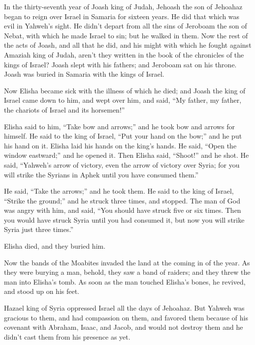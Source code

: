  In the thirty-seventh year of Joash king of Judah, Jehoash
the son of Jehoahaz began to reign over Israel in Samaria for sixteen
years.  He did that which was evil in Yahweh's sight. He
didn't depart from all the sins of Jeroboam the son of Nebat, with which
he made Israel to sin; but he walked in them.  Now the rest
of the acts of Joash, and all that he did, and his might with which he
fought against Amaziah king of Judah, aren't they written in the book of
the chronicles of the kings of Israel?  Joash slept with
his fathers; and Jeroboam sat on his throne. Joash was buried in Samaria
with the kings of Israel.

 Now Elisha became sick with the illness of which he died;
and Joash the king of Israel came down to him, and wept over him, and
said, ``My father, my father, the chariots of Israel and its horsemen!''

 Elisha said to him, ``Take bow and arrows;'' and he took
bow and arrows for himself.  He said to the king of Israel,
``Put your hand on the bow;'' and he put his hand on it. Elisha laid his
hands on the king's hands.  He said, ``Open the window
eastward;'' and he opened it. Then Elisha said, ``Shoot!'' and he shot.
He said, ``Yahweh's arrow of victory, even the arrow of victory over
Syria; for you will strike the Syrians in Aphek until you have consumed
them.''

 He said, ``Take the arrows;'' and he took them. He said to
the king of Israel, ``Strike the ground;'' and he struck three times,
and stopped.  The man of God was angry with him, and said,
``You should have struck five or six times. Then you would have struck
Syria until you had consumed it, but now you will strike Syria just
three times.''

 Elisha died, and they buried him.

Now the bands of the Moabites invaded the land at the coming in of the
year.  As they were burying a man, behold, they saw a band
of raiders; and they threw the man into Elisha's tomb. As soon as the
man touched Elisha's bones, he revived, and stood up on his feet.

 Hazael king of Syria oppressed Israel all the days of
Jehoahaz.  But Yahweh was gracious to them, and had
compassion on them, and favored them because of his covenant with
Abraham, Isaac, and Jacob, and would not destroy them and he didn't cast
them from his presence as yet.

